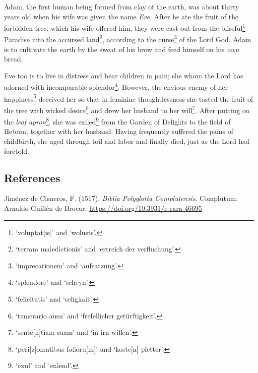 \documentclass[
]{article}
\begin{document}
Adam, the first human being formed from clay of the earth, was about
thirty years old when his wife was given the name \emph{Eve}. After he
ate the fruit of the forbidden tree, which his wife offered him, they
were cast out from the blissful\footnote{`voluptat{[}is{]}' and
  `wolusts'.} Paradise into the accursed land\footnote{`terram
  maledictionis' and `ertreich der verfluchung'.}, according to the
curse\footnote{`imprecationem' and `aufsatzung'.} of the Lord God. Adam
is to cultivate the earth by the sweat of his brow and feed himself on
his \emph{own} bread.

Eve too is to live in distress and bear children in pain; she whom the
Lord has adorned with incomparable splendor\footnote{`splendore' and
  `scheyn'.}. However, the envious enemy of her happiness\footnote{`felicitatis'
  and `seligkait'.} deceived her so that in feminine thoughtlessness she
tasted the fruit of the tree with wicked desire\footnote{`temerario
  ausu' and `frefellicher getürftigkeit'.} and drew her husband to her
will\footnote{`sente{[}n{]}tiam suam' and `in irn willen'.}. After
putting on the \emph{leaf apron}\footnote{`peri{[}z{]}omatibus
  folioru{[}m{]}' and `koste{[}n{]} pletter'.}, she was
exiled\footnote{`exul' and `enlend'.} from the Garden of Delights to the
field of Hebron, together with her husband. Having frequently suffered
the pains of childbirth, she aged through toil and labor and finally
died, just as the Lord had foretold.

\hypertarget{references}{%
\subsection{References}\label{references}}

Jiménez de Cisneros, F. (1517). \emph{Biblia Polyglotta Complutensis}.
Complutum: Arnaldo Guillén de Brocar.
\url{https://doi.org/10.3931/e-rara-46695}
\end{document}
